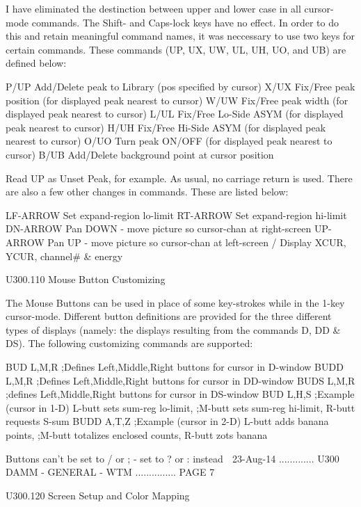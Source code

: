    I have eliminated the destinction between  upper  and  lower  case  in  all
   cursor-mode  commands.  The  Shift-  and  Caps-lock keys have no effect. In
   order to do this and retain meaningful command names, it was neccessary  to
   use  two keys for certain commands. These commands (UP, UX, UW, UL, UH, UO,
   and UB) are defined below:
 
   P/UP   Add/Delete peak to Library (pos specified by cursor)
   X/UX   Fix/Free  peak position (for displayed peak nearest to cursor)
   W/UW   Fix/Free  peak width    (for displayed peak nearest to cursor)
   L/UL   Fix/Free  Lo-Side ASYM  (for displayed peak nearest to cursor)
   H/UH   Fix/Free  Hi-Side ASYM  (for displayed peak nearest to cursor)
   O/UO   Turn peak  ON/OFF       (for displayed peak nearest to cursor)
   B/UB   Add/Delete background point at cursor position
 
   Read UP as Unset Peak, for example. As usual, no carriage return  is  used.
   There are also a few other changes in commands. These are listed below:
 
   LF-ARROW    Set expand-region lo-limit
   RT-ARROW    Set expand-region hi-limit
   DN-ARROW    Pan DOWN - move picture so cursor-chan at right-screen
   UP-ARROW    Pan UP   - move picture so cursor-chan at  left-screen
   /           Display XCUR, YCUR, channel# & energy
 
   U300.110  Mouse Button Customizing
 
   The  Mouse  Buttons  can  be used in place of some key-strokes while in the
   1-key cursor-mode. Different button definitions are provided for the  three
   different  types  of  displays  (namely:  the  displays  resulting from the
   commands  D, DD & DS). The following customizing commands are supported:
 
   BUD  L,M,R  ;Defines Left,Middle,Right buttons for cursor in  D-window
   BUDD L,M,R  ;Defines Left,Middle,Right buttons for cursor in DD-window
   BUDS L,M,R  ;defines Left,Middle,Right buttons for cursor in DS-window
   BUD  L,H,S  ;Example (cursor in 1-D)   L-butt sets sum-reg lo-limit,
               ;M-butt sets sum-reg hi-limit,  R-butt requests S-sum
   BUDD A,T,Z  ;Example (cursor in 2-D)   L-butt adds banana points,
               ;M-butt totalizes enclosed counts,  R-butt zots banana
 
   Buttons can't be set to  / or ;  -  set to  ? or :  instead
    
   23-Aug-14 ............. U300  DAMM - GENERAL - WTM ............... PAGE   7
 
   U300.120  Screen Setup and Color Mapping
 
